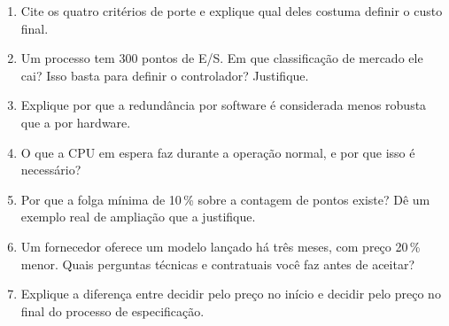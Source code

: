 \begin{exercicios}
\begin{enumerate}[label=\alph*)]
  \item Cite os quatro critérios de porte e explique qual deles costuma definir o custo final.
  \item Um processo tem 300 pontos de E/S. Em que classificação de mercado ele cai? Isso basta para
        definir o controlador? Justifique.
  \item Explique por que a redundância por software é considerada menos robusta que a por hardware.
  \item O que a CPU em espera faz durante a operação normal, e por que isso é necessário?
  \item Por que a folga mínima de 10\,\% sobre a contagem de pontos existe? Dê um exemplo real de
        ampliação que a justifique.
  \item Um fornecedor oferece um modelo lançado há três meses, com preço 20\,\% menor. Quais
        perguntas técnicas e contratuais você faz antes de aceitar?
  \item Explique a diferença entre decidir pelo preço no início e decidir pelo preço no final do
        processo de especificação.
\end{enumerate}
\end{exercicios}
